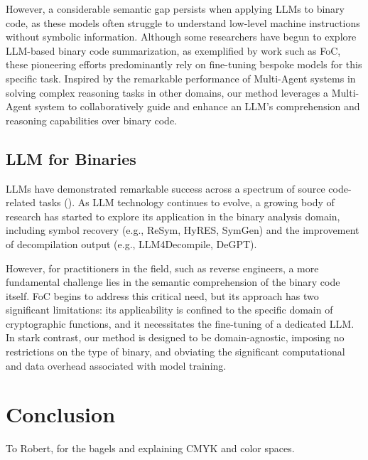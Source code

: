 \documentclass[acmsmall,screen,review,anonymous]{acmart} %
\begin{document}
However, a considerable semantic gap persists when applying LLMs to binary code, as these models often struggle to understand low-level machine instructions without symbolic information. Although some researchers have begun to explore LLM-based binary code summarization, as exemplified by work such as FoC, these pioneering efforts predominantly rely on fine-tuning bespoke models for this specific task. Inspired by the remarkable performance of Multi-Agent systems in solving complex reasoning tasks in other domains, our method leverages a Multi-Agent system to collaboratively guide and enhance an LLM's comprehension and reasoning capabilities over binary code.


\subsection{LLM for Binaries}
LLMs have demonstrated remarkable success across a spectrum of source code-related tasks (). As LLM technology continues to evolve, a growing body of research has started to explore its application in the binary analysis domain, including symbol recovery (e.g., ReSym, HyRES, SymGen) and the improvement of decompilation output (e.g., LLM4Decompile, DeGPT).

However, for practitioners in the field, such as reverse engineers, a more fundamental challenge lies in the semantic comprehension of the binary code itself. FoC begins to address this critical need, but its approach has two significant limitations: its applicability is confined to the specific domain of cryptographic functions, and it necessitates the fine-tuning of a dedicated LLM. In stark contrast, our method is designed to be domain-agnostic, imposing no restrictions on the type of binary, and obviating the significant computational and data overhead associated with model training.



\section{Conclusion}




\begin{acks}
To Robert, for the bagels and explaining CMYK and color spaces.
\end{acks}
\end{document}
